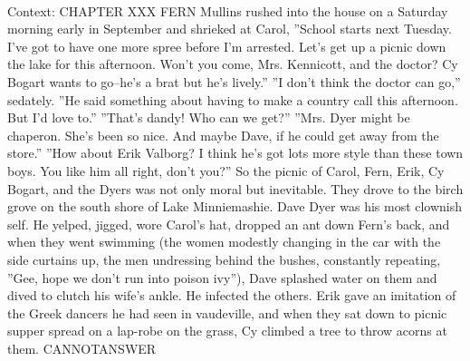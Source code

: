 \documentclass[11pt,a4paper, onecolumn]{article}
\begin{document}
\\ Context: CHAPTER XXX FERN Mullins rushed into the house on a Saturday morning early in September and shrieked at Carol, ''School starts next Tuesday. I've got to have one more spree before I'm arrested. Let's get up a picnic down the lake for this afternoon. Won't you come, Mrs. Kennicott, and the doctor? Cy Bogart wants to go--he's a brat but he's lively.'' ''I don't think the doctor can go,'' sedately. ''He said something about having to make a country call this afternoon. But I'd love to.'' ''That's dandy! Who can we get?'' ''Mrs. Dyer might be chaperon. She's been so nice. And maybe Dave, if he could get away from the store.'' ''How about Erik Valborg? I think he's got lots more style than these town boys. You like him all right, don't you?'' So the picnic of Carol, Fern, Erik, Cy Bogart, and the Dyers was not only moral but inevitable. They drove to the birch grove on the south shore of Lake Minniemashie. Dave Dyer was his most clownish self. He yelped, jigged, wore Carol's hat, dropped an ant down Fern's back, and when they went swimming (the women modestly changing in the car with the side curtains up, the men undressing behind the bushes, constantly repeating, ''Gee, hope we don't run into poison ivy''), Dave splashed water on them and dived to clutch his wife's ankle. He infected the others. Erik gave an imitation of the Greek dancers he had seen in vaudeville, and when they sat down to picnic supper spread on a lap-robe on the grass, Cy climbed a tree to throw acorns at them. CANNOTANSWER
\end{document}
